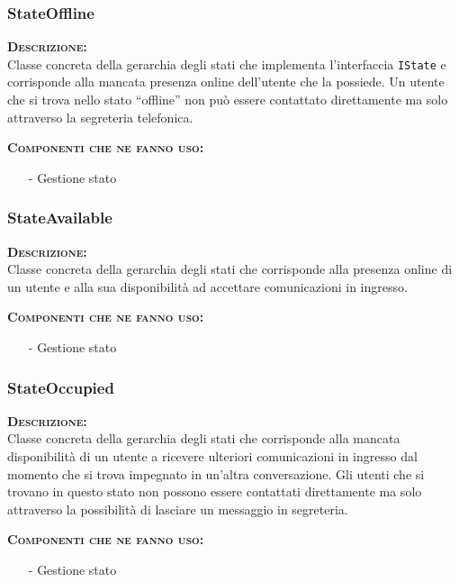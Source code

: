 \subsubsection{StateOffline}
\begin{description}
	\item{\scshape\bfseries Descrizione:}\\
Classe concreta della gerarchia degli stati che implementa l'interfaccia \texttt{IState} e corrisponde alla mancata presenza online dell'utente che la possiede. Un utente che si trova nello stato ``offline'' non può essere contattato direttamente ma solo attraverso la segreteria telefonica.
	\item{\scshape\bfseries Componenti che ne fanno uso:}
	\begin{itemize}[noitemsep,nolistsep]
	  \item[-] Gestione stato
	\end{itemize}
\end{description}

\subsubsection{StateAvailable}
\begin{description}
	\item{\scshape\bfseries Descrizione:}\\
Classe concreta della gerarchia degli stati che corrisponde alla presenza online di un utente e alla sua disponibilità ad accettare comunicazioni in ingresso.
	\item{\scshape\bfseries Componenti che ne fanno uso:}
    \begin{itemize}[noitemsep,nolistsep]
      \item[-] Gestione stato
    \end{itemize}
\end{description}

\subsubsection{StateOccupied}
\begin{description}
	\item{\scshape\bfseries Descrizione:}\\
Classe concreta della gerarchia degli stati che corrisponde alla mancata disponibilità di un utente a ricevere ulteriori comunicazioni in ingresso dal momento che si trova impegnato in un'altra conversazione. Gli utenti che si trovano in questo stato non possono essere contattati direttamente ma solo attraverso la possibilità di lasciare un messaggio in segreteria.
	\item{\scshape\bfseries Componenti che ne fanno uso:}
	\begin{itemize}[noitemsep,nolistsep]
	  \item[-] Gestione stato
	\end{itemize}
\end{description}


